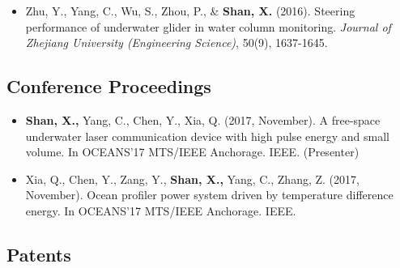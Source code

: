 \documentclass[11pt,a4paper,sans]{moderncv}         %
\begin{document}
\begin{itemize}

	\item{Zhu, Y., Yang, C., Wu, S., Zhou, P., \& \textbf{Shan, X.} (2016). Steering performance of underwater glider in water column monitoring. \textit{Journal of Zhejiang University (Engineering Science)}, 50(9), 1637-1645.}

	      \vspace{3pt}

\end{itemize}

\subsection{Conference Proceedings}

\begin{itemize}

	\item{\textbf{Shan, X.,}  Yang, C., Chen, Y., Xia, Q. (2017, November). A free-space underwater laser communication device with high pulse energy and small volume. In OCEANS'17 MTS/IEEE Anchorage. IEEE. (Presenter)}

	      \vspace{3pt}

\end{itemize}

\begin{itemize}

	\item{Xia, Q., Chen, Y., Zang, Y., \textbf{Shan, X.,}  Yang, C., Zhang, Z. (2017, November). Ocean profiler power system driven by temperature difference energy. In OCEANS'17 MTS/IEEE Anchorage. IEEE.}

	      \vspace{3pt}

\end{itemize}

\subsection{Patents}
\end{document}

